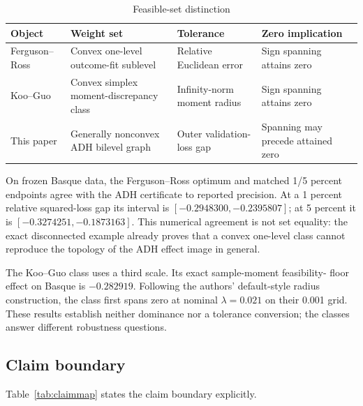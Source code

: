 \documentclass[10pt]{article}
\theoremstyle{definition}
\begin{document}
\begin{table}[ht]
\centering
\caption{Feasible-set distinction}\label{tab:classes}
\small
\begin{tabular}{@{}>{\raggedright\arraybackslash}p{}
                    >{\raggedright\arraybackslash}p{}
                    >{\raggedright\arraybackslash}p{}
                    >{\raggedright\arraybackslash}p{}@{}}
\toprule
Object & Weight set & Tolerance & Zero implication \\
\midrule
Ferguson--Ross & Convex one-level outcome-fit sublevel & Relative Euclidean error & Sign spanning attains zero \\
Koo--Guo & Convex simplex moment-discrepancy class & Infinity-norm moment radius & Sign spanning attains zero \\
This paper & Generally nonconvex ADH bilevel graph & Outer validation-loss gap & Spanning may precede attained zero \\
\bottomrule
\end{tabular}
\end{table}

On frozen Basque data, the Ferguson--Ross optimum and matched 1/5 percent
endpoints agree with the ADH certificate to reported precision.  At a 1 percent
relative squared-loss gap its interval is
$[-0.2948300,-0.2395807]$; at 5 percent it is
$[-0.3274251,-0.1873163]$.  This numerical agreement is not set equality: the
exact disconnected example already proves that a convex one-level class cannot
reproduce the topology of the ADH effect image in general.

The Koo--Guo class uses a third scale.  Its exact sample-moment feasibility-
floor effect on Basque is $-0.282919$.  Following the authors' default-style
radius construction, the class first spans zero at nominal
$\lambda=0.021$ on their 0.001 grid.  These results establish neither dominance
nor a tolerance conversion; the classes answer different robustness questions.

\subsection{Claim boundary}

Table~\ref{tab:claimmap} states the claim boundary explicitly.
\end{document}
